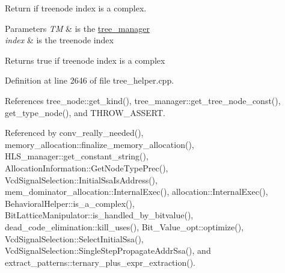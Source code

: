 Return if treenode index is a complex. 


\begin{DoxyParams}{Parameters}
{\em TM} & is the \hyperlink{classtree__manager}{tree\+\_\+manager} \\
\hline
{\em index} & is the treenode index \\
\hline
\end{DoxyParams}
\begin{DoxyReturn}{Returns}
true if treenode index is a complex 
\end{DoxyReturn}


Definition at line 2646 of file tree\+\_\+helper.\+cpp.



References tree\+\_\+node\+::get\+\_\+kind(), tree\+\_\+manager\+::get\+\_\+tree\+\_\+node\+\_\+const(), get\+\_\+type\+\_\+node(), and T\+H\+R\+O\+W\+\_\+\+A\+S\+S\+E\+RT.



Referenced by conv\+\_\+really\+\_\+needed(), memory\+\_\+allocation\+::finalize\+\_\+memory\+\_\+allocation(), H\+L\+S\+\_\+manager\+::get\+\_\+constant\+\_\+string(), Allocation\+Information\+::\+Get\+Node\+Type\+Prec(), Vcd\+Signal\+Selection\+::\+Initial\+Ssa\+Is\+Address(), mem\+\_\+dominator\+\_\+allocation\+::\+Internal\+Exec(), allocation\+::\+Internal\+Exec(), Behavioral\+Helper\+::is\+\_\+a\+\_\+complex(), Bit\+Lattice\+Manipulator\+::is\+\_\+handled\+\_\+by\+\_\+bitvalue(), dead\+\_\+code\+\_\+elimination\+::kill\+\_\+uses(), Bit\+\_\+\+Value\+\_\+opt\+::optimize(), Vcd\+Signal\+Selection\+::\+Select\+Initial\+Ssa(), Vcd\+Signal\+Selection\+::\+Single\+Step\+Propagate\+Addr\+Ssa(), and extract\+\_\+patterns\+::ternary\+\_\+plus\+\_\+expr\+\_\+extraction().

